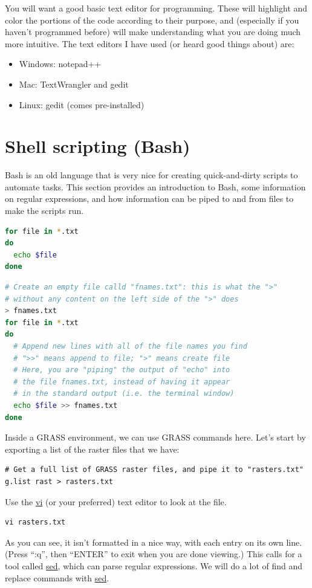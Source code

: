 \documentclass{book}
\begin{document}
You will want a good basic text editor for programming. These will highlight and color the portions of the code according to their purpose, and (especially if you haven't programmed before) will make understanding what you are doing much more intuitive. The text editors I have used (or heard good things about) are:

\begin{itemize}
	\item Windows: notepad++
	\item Mac: TextWrangler and gedit
	\item Linux: gedit (comes pre-installed)
\end{itemize}

\section{Shell scripting (Bash) \label{s:BashScripting}}

Bash is an old language that is very nice for creating quick-and-dirty scripts to automate tasks. This section provides an introduction to Bash, some information on regular expressions, and how information can be piped to and from files to make the scripts run.

\begin{lstlisting}[language=Bash]
for file in *.txt
do
  echo $file
done
\end{lstlisting}

\begin{lstlisting}[language=Bash]
# Create an empty file calld "fnames.txt": this is what the ">" 
# without any content on the left side of the ">" does
> fnames.txt
for file in *.txt
do
  # Append new lines with all of the file names you find
  # ">>" means append to file; ">" means create file
  # Here, you are "piping" the output of "echo" into 
  # the file fnames.txt, instead of having it appear 
  # in the standard output (i.e. the terminal window)
  echo $file >> fnames.txt
done
\end{lstlisting}

Inside a GRASS environment, we can use GRASS commands here. Let's start by exporting a list of the raster files that we have:
\begin{lstlisting}
# Get a full list of GRASS raster files, and pipe it to "rasters.txt"
g.list rast > rasters.txt
\end{lstlisting}

Use the \url{vi} (or your preferred) text editor to look at the file.
\begin{lstlisting}
vi rasters.txt
\end{lstlisting}
As you can see, it isn't formatted in a nice way, with each entry on its own line. (Press ``:q'', then ``ENTER'' to exit when you are done viewing.) This calls for a tool called \url{sed}, which can parse regular expressions. We will do a lot of find and replace commands with \url{sed}.
\end{document}
